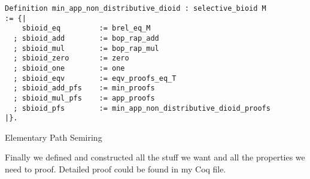 \begin{listing}[H]
\begin{verbatim}
Definition min_app_non_distributive_dioid : selective_bioid M
:= {|
    sbioid_eq         := brel_eq_M
  ; sbioid_add        := bop_rap_add
  ; sbioid_mul        := bop_rap_mul                                 
  ; sbioid_zero       := zero
  ; sbioid_one        := one
  ; sbioid_eqv        := eqv_proofs_eq_T
  ; sbioid_add_pfs    := min_proofs
  ; sbioid_mul_pfs    := app_proofs
  ; sbioid_pfs        := min_app_non_distributive_dioid_proofs
|}.
\end{verbatim}
\caption{Elementary Path Semiring} 
\label{coq:def:min_app_non_distributive_dioid}
\end{listing}

Finally we defined and constructed all the stuff we want and all the properties we need to proof. Detailed proof could be found in my Coq file.

